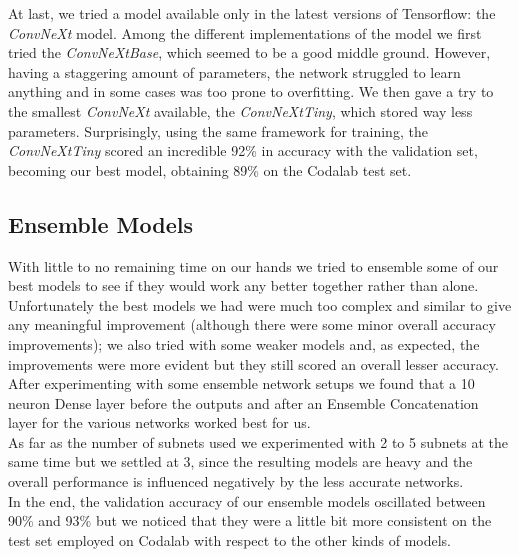 \documentclass[11pt]{report}
\begin{document}
At last, we tried a model available only in the latest versions of Tensorflow: the \textit{ConvNeXt} model. Among the different implementations of the model we first tried the \textit{ConvNeXtBase}, which seemed to be a good middle ground. However, having a staggering amount of parameters, the network struggled to learn anything and in some cases was too prone to overfitting. We then gave a try to the smallest \textit{ConvNeXt} available, the \textit{ConvNeXtTiny}, which stored way less parameters. Surprisingly, using the same framework for training, the \textit{ConvNeXtTiny} scored an incredible 92\% in accuracy with the validation set, becoming our best model, obtaining 89\% on the Codalab test set.

\subsection{Ensemble Models}
With little to no remaining time on our hands we tried to ensemble some of our best models to see if they would work any better together rather than alone. \\
Unfortunately the best models we had were much too complex and similar to give any meaningful improvement (although there were some minor overall accuracy improvements); we also tried with some weaker models and, as expected, the improvements were more evident but they still scored an overall lesser accuracy. \\
After experimenting with some ensemble network setups we found that a 10 neuron Dense layer before the outputs and after an Ensemble Concatenation layer for the various networks worked best for us. \\
As far as the number of subnets used we experimented with 2 to 5 subnets at the same time but we settled at 3, since the resulting models are heavy and the overall performance is influenced negatively by the less accurate networks. \\
In the end, the validation accuracy of our ensemble models oscillated between 90\% and 93\% but we noticed that they were a little bit more consistent on the test set employed on Codalab with respect to the other kinds of models.
\end{document}
